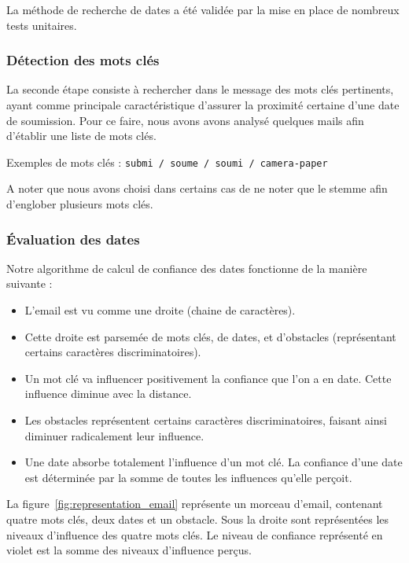 \documentclass[a4paper,french,10pt]{article}
\begin{document}
La méthode de recherche de dates a été validée par la mise en place de nombreux tests unitaires.

\subsubsection{Détection des mots clés}
La seconde étape consiste à rechercher dans le message des mots clés pertinents, ayant comme principale caractéristique d'assurer la proximité certaine d'une date de soumission. Pour ce faire, nous avons avons analysé quelques mails afin d'établir une liste de mots clés.

Exemples de mots clés : \texttt{submi / soume / soumi / camera-paper}

A noter que nous avons choisi dans certains cas de ne noter que le stemme afin d'englober plusieurs mots clés.

\subsubsection{Évaluation des dates}

Notre algorithme de calcul de confiance des dates fonctionne de la manière suivante :

\begin{itemize}
\item L'email est vu comme une droite (chaine de caractères).
\item Cette droite est parsemée de mots clés, de dates, et d'obstacles (représentant certains caractères discriminatoires).
\item Un mot clé va influencer positivement la confiance que l'on a en date. Cette influence diminue avec la distance.
\item Les obstacles représentent certains caractères discriminatoires, faisant ainsi diminuer radicalement leur influence.
\item Une date absorbe totalement l'influence d'un mot clé. La confiance d'une date est déterminée par la somme de toutes les influences qu'elle perçoit.
\end{itemize}

La figure~\ref{fig:representation_email} représente un morceau d'email, contenant quatre mots clés, deux dates et un obstacle. Sous la droite sont représentées les niveaux d'influence des quatre mots clés. Le niveau de confiance représenté en violet est la somme des niveaux d'influence perçus.
\end{document}
